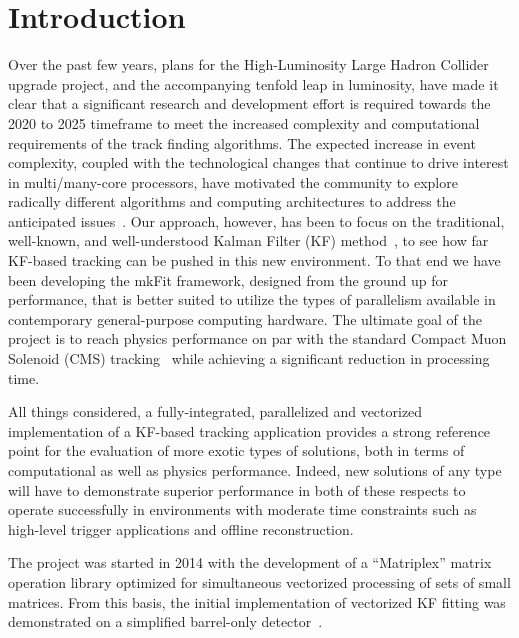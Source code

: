\documentclass{webofc}
\def\mkfit{mkFit\xspace}
\begin{document}
\maketitle


\section{Introduction}

Over the past few years, plans for the High-Luminosity Large Hadron Collider
upgrade project, and the accompanying tenfold leap in luminosity, have made it
clear that a significant research and development effort is required towards the
2020 to 2025 timeframe to meet the increased complexity and computational
requirements of the track finding algorithms. The expected increase in event
complexity, coupled with the technological changes that continue to drive
interest in multi/many-core processors, have motivated the community to explore
radically different algorithms and computing architectures to address the
anticipated issues~\cite{CTD2018}. Our approach, however, has been to focus on
the traditional, well-known, and well-understood Kalman Filter (KF) method~\cite{Fruhwirth}, to
see how far KF-based tracking can be pushed in this new environment. To that
end we have been developing the \mkfit framework, designed from the ground up for
performance, that is better suited to utilize the types of parallelism available
in contemporary general-purpose computing hardware. The ultimate goal of the project is
to reach physics performance on par with the standard Compact Muon Solenoid (CMS)
tracking~\cite{CMS-tracking} while achieving a significant reduction in processing time.

All things considered, a fully-integrated, parallelized and vectorized implementation 
of a KF-based tracking application provides a strong reference point for the evaluation 
of more exotic types of solutions, both in terms of computational as well as physics performance. 
Indeed, new solutions of any type will have to demonstrate superior performance in both of these 
respects to operate successfully in environments with moderate time constraints such as high-level 
trigger applications and offline reconstruction.

The project was started in 2014 with the development of a
``Matriplex'' matrix operation library optimized for simultaneous vectorized
processing of sets of small matrices. From this basis, the initial
implementation of vectorized KF fitting was demonstrated on a simplified
barrel-only detector~\cite{pkf-fit}.
\end{document}
